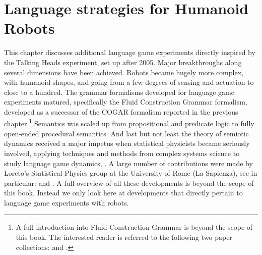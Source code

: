 \chapter{Language strategies for Humanoid Robots}

This chapter discusses additional language game experiments directly inspired by the Talking Heads experiment, 
set up after 2005. Major breakthroughs along several dimensions have been achieved. Robots became hugely 
more complex, with humanoid shapes, and going from a few degrees of sensing and actuation to close to a hundred. The grammar 
formalisms developed for language game experiments matured, specifically the Fluid Construction Grammar formalism, developed 
as a successor of the COGAR formalism reported in the previous chapter.\footnote{
A full introduction into Fluid Construction Grammar  
is beyond the scope of this book. The interested reader is 
referred to the following two paper collections: \cite{Steels:2011} and \cite{Steels:2012}.}
Semantics was scaled up from propositional and predicate logic to fully open-ended procedural semantics.
And last but not least the theory of semiotic dynamics received a major impetus when statistical physicists became seriously 
involved, applying techniques and methods from complex systems science to study language game
dynamics, \cite{Loreto:2007}. 
A large number of contributions were made by Loreto's Statistical Physics group at the University of Rome (La Sapienza), 
see in particular: \cite{DallaAsta:2006} and \cite{Baronchelli:2012}.
A full overview of all these developments is beyond the 
scope of this book. Instead we only look here at developments that directly pertain to language game experiments with robots. 

